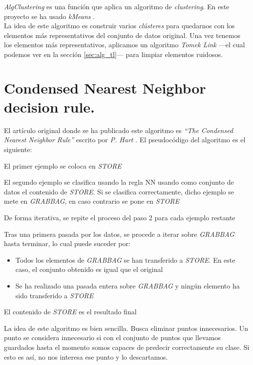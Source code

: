 \textit{AlgClustering} es una función que aplica un algoritmo de \textit{clustering}. En este proyecto se ha usado \textit{kMeans} \cite{kmeans}. \\ 

La idea de este algoritmo es construir varios \textit{clústeres} para quedarnos con los elementos más representativos del conjunto de datos original. Una vez tenemos los elementos más representativos, aplicamos un algoritmo \textit{Tomek Link} —el cual podemos ver en la sección \ref{sec:alg_tl}— para limpiar elementos ruidosos.

\section{Condensed Nearest Neighbor decision rule.} \label{sec:alg_cnn}
El artículo original donde se ha publicado este algoritmo es \textit{``The Condensed Nearest Neighbor Rule''} escrito por \textit{P. Hart} \cite{cnn}. El pseudocódigo del algoritmo es el siguiente:

\begin{codigo}
\begin{algorithmic}[1]
\State El primer ejemplo se coloca en \textit{STORE}
\State \parbox[t]{305pt}{El segundo ejemplo se clasifica usando la regla NN usando como conjunto de datos el contenido de \textit{STORE}. Si se clasifica correctamente, dicho ejemplo se mete en \textit{GRABBAG}, en caso contrario se pone en \textit{STORE}\strut}
\State \parbox[t]{305pt}{De forma iterativa, se repite el proceso del paso 2 para cada ejemplo restante\strut} 
\State \parbox[t]{305pt}{Tras una primera pasada por los datos, se procede a iterar sobre \textit{GRABBAG} hasta terminar, lo cual puede suceder por:\strut} 
\begin{itemize}
	\item \parbox[t]{305pt}{Todos los elementos de \textit{GRABBAG} se han transferido a \textit{STORE}. En este caso, el conjunto obtenido es igual que el original\strut}
	\item \parbox[t]{305pt}{Se ha realizado una pasada entera sobre \textit{GRABBAG} y ningún elemento ha sido transferido a \textit{STORE}\strut}
\end{itemize}
\State \Return El contenido de \textit{STORE} es el resultado final
\EndFunction 
\end{algorithmic}
\end{codigo}

La idea de este algoritmo es bien sencilla. Busca eliminar puntos innecesarios. Un punto se considera innecesario si con el conjunto de puntos que llevamos guardados hasta el momento somos capaces de predecir correctamente su clase. Si esto es así, no nos interesa ese punto y lo descartamos.

